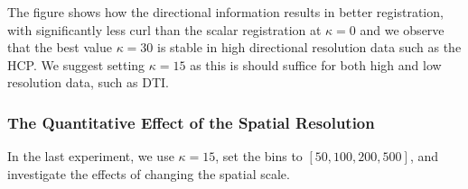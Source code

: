 \documentclass[twocolumn]{svjour3}
\begin{document}
The figure shows how the directional information results in better registration, with
significantly less curl than the scalar registration at $\kappa=0$ and we observe that the
best value $\kappa=30$ is stable in high directional resolution data such as the HCP. We
suggest setting $\kappa=15$ as this is should suffice for both high and low resolution
data, such as DTI.

\subsubsection{The Quantitative Effect of the Spatial Resolution}
\label{subsec:spatialparam}

In the last experiment, we use $\kappa=15$, set the bins to $[50,100,200,500]$, and
investigate the effects of changing the spatial scale.
\begin{figure}[!htb]
  \centering
  \hspace*{0cm}
  \hspace*{0cm}

\end{figure}
\end{document}
